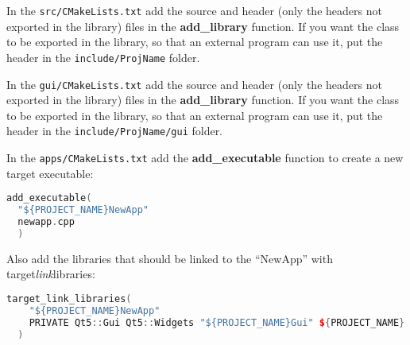 
In the \texttt{src/CMakeLists.txt} add the source and header (only the
headers not exported in the library) files in the \textbf{add\_library}
function. If you want the class to be exported in the library, so that
an external program can use it, put the header in the
\texttt{include/ProjName} folder.



In the \texttt{gui/CMakeLists.txt} add the source and header (only the
headers not exported in the library) files in the \textbf{add\_library}
function. If you want the class to be exported in the library, so that
an external program can use it, put the header in the
\texttt{include/ProjName/gui} folder.



In the \texttt{apps/CMakeLists.txt} add the \textbf{add\_executable}
function to create a new target executable:

\begin{lstlisting}[language=c++]
  add_executable(
  "${PROJECT_NAME}NewApp"
  newapp.cpp
  )
\end{lstlisting}

Also add the libraries that should be linked to the ``NewApp'' with
target\emph{link}libraries:

\begin{lstlisting}[language=c++]
  target_link_libraries(
    "${PROJECT_NAME}NewApp"
    PRIVATE Qt5::Gui Qt5::Widgets "${PROJECT_NAME}Gui" ${PROJECT_NAME} ${SUBMODULES_NAME}
  )
\end{lstlisting}
